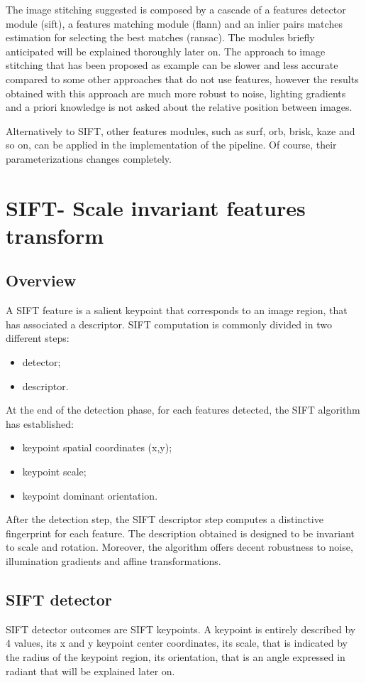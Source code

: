 \documentclass[aps,letterpaper,10pt]{revtex4}
\begin{document}
The image stitching suggested is composed by a cascade of a features detector module (sift), a features matching module (flann) and an inlier pairs matches estimation for selecting the best matches (ransac). The modules briefly anticipated will be explained thoroughly later on. The approach to image stitching that has been proposed as example can be slower and less accurate compared to some other approaches that do not use features, however the results obtained with this approach are much more robust to noise, lighting gradients and a priori knowledge is not asked about the relative position between images.  
\vspace{3mm}  

Alternatively to SIFT, other features modules, such as surf, orb, brisk, kaze and so on, can be applied in the implementation of the pipeline. Of course, their parameterizations changes completely.

\section{SIFT- Scale invariant features transform}
\subsection{Overview}
A SIFT feature is a salient keypoint that corresponds to an image region, that has associated a descriptor. SIFT computation is commonly divided in two different steps:
\begin{itemize}
\item detector;
\item descriptor.
\end{itemize}
At the end of the detection phase, for each features detected, the SIFT algorithm has established:
\begin{itemize}
\item keypoint spatial coordinates (x,y);
\item keypoint scale;
\item keypoint dominant orientation.  
\end{itemize}
After the detection step, the SIFT descriptor step computes a distinctive fingerprint for each feature. The description obtained is designed to be invariant to scale and rotation. Moreover, the algorithm offers decent robustness to noise, illumination gradients and affine transformations.
\subsection{SIFT detector}
SIFT detector outcomes are SIFT keypoints. A keypoint is entirely described by 4 values, its x and y keypoint center coordinates, its scale, that is indicated by the radius of the keypoint region, its orientation, that is an angle expressed in radiant that will be explained later on. 
\end{document}
